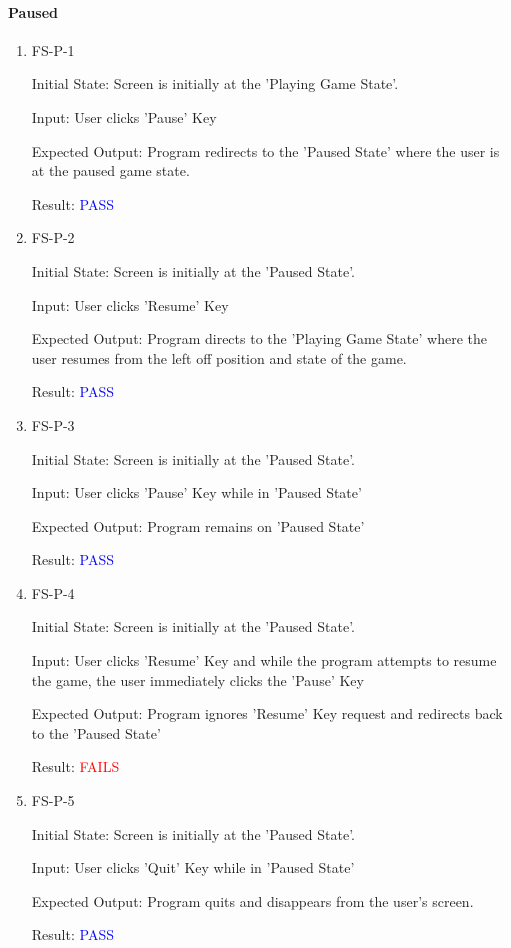 \documentclass[12pt, titlepage]{article}
\begin{document}
\paragraph{Paused}

\begin{enumerate}

\item{FS-P-1\\}

Initial State: Screen is initially at the 'Playing Game State'.
					
Input: User clicks 'Pause' Key
					
Expected Output: Program redirects to the 'Paused State' where the user is at the paused game state.
					
Result: \textcolor{blue}{PASS}
					
\item{FS-P-2\\}

Initial State: Screen is initially at the 'Paused State'.
					
Input: User clicks 'Resume' Key
					
Expected Output: Program directs to the 'Playing Game State' where the user resumes from the left off position and state of the game.
					
Result: \textcolor{blue}{PASS}


\item{FS-P-3\\}

Initial State: Screen is initially at the 'Paused State'.
					
Input: User clicks 'Pause' Key while in 'Paused State'
					
Expected Output: Program remains on 'Paused State'
					
Result: \textcolor{blue}{PASS}

\item{FS-P-4\\}

Initial State: Screen is initially at the 'Paused State'.
					
Input: User clicks 'Resume' Key and while the program attempts to resume the game, the user immediately clicks the 'Pause' Key
					
Expected Output: Program ignores 'Resume' Key request and redirects back to the 'Paused State'
					
Result: \textcolor{red}{FAILS}

\item{FS-P-5\\}

Initial State: Screen is initially at the 'Paused State'.
					
Input: User clicks 'Quit' Key while in 'Paused State'
					
Expected Output: Program quits and disappears from the user's screen. 
					
Result: \textcolor{blue}{PASS}

\end{enumerate}
\end{document}
